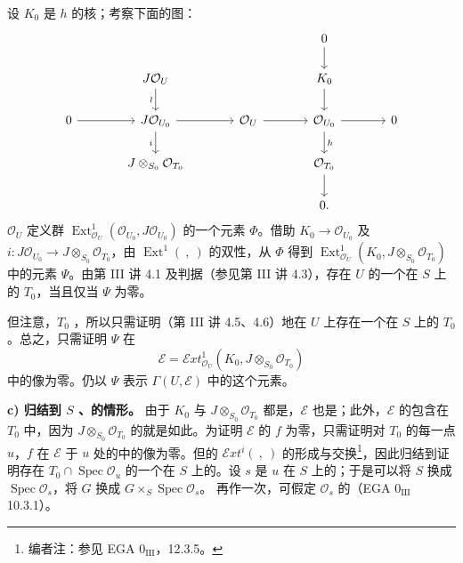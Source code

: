 设 $K_0$ 是 $h$ 的核；考察下面的图：
\[
\begin{tikzcd}[column sep=large]
&&&0\arrow[d]\\
&J\mathcal O_U\arrow[d,"\wr"']&&K_0\arrow[d]\\
0\arrow[r]&J\mathcal O_{U_0}\arrow[r]\arrow[d,"i"']&\mathcal O_U\arrow[r]&\mathcal O_{U_0}\arrow[r]\arrow[d,"h"]&0\\
&J\otimes_{S_0}\mathcal O_{T_0}&&\mathcal O_{T_0}\arrow[d]\\
&&&0.
\end{tikzcd}
\]
 $\mathcal O_U$ 定义群 $\operatorname{Ext}^1_{\mathcal O_U}(\mathcal O_{U_0},J\mathcal O_{U_0})$ 的一个元素 $\Phi$。借助 $K_0\to\mathcal O_{U_0}$ 及 $i:J\mathcal O_{U_0}\to J\otimes_{S_0}\mathcal O_{T_0}$，由 $\operatorname{Ext}^1(\ ,\ )$ 的双性，从 $\Phi$ 得到 $\operatorname{Ext}^1_{\mathcal O_U}(K_0,J\otimes_{S_0}\mathcal O_{T_0})$ 中的元素 $\Psi$。由第 III 讲 4.1 及判据（参见第 III 讲 4.3），存在 $U$ 的一个在 $S$ 上的 $T_0$，当且仅当 $\Psi$ 为零。

但注意，$T_0$ ，所以只需证明（第 III 讲 4.5、4.6）地在 $U$ 上存在一个在 $S$ 上的 $T_0$。总之，只需证明 $\Psi$ 在
\[\mathcal E=\mathscr Ext^1_{\mathcal O_U}(K_0,J\otimes_{S_0}\mathcal O_{T_0})\]
中的像为零。仍以 $\Psi$ 表示 $\Gamma(U,\mathcal E)$ 中的这个元素。

\textbf{c) 归结到 $S$ 、的情形。}
由于 $K_0$ 与 $J\otimes_{S_0}\mathcal O_{T_0}$ 都是，$\mathcal E$ 也是；此外，$\mathcal E$ 的包含在 $T_0$ 中，因为 $J\otimes_{S_0}\mathcal O_{T_0}$ 的就是如此。为证明 $\mathcal E$ 的 $f$ 为零，只需证明对 $T_0$ 的每一点 $u$，$f$ 在 $\mathcal E$ 于 $u$ 处的中的像为零。但的 $\mathscr Ext^i(\ ,\ )$ 的形成与交换\footnote{编者注：参见 EGA 0$_{\mathrm{III}}$，12.3.5。}，因此归结到证明存在 $T_0\cap\operatorname{Spec}\mathcal O_u$ 的一个在 $S$ 上的。设 $s$ 是 $u$ 在 $S$ 上的；于是可以将 $S$ 换成 $\operatorname{Spec}\mathcal O_s$，将 $G$ 换成 $G\times_S\operatorname{Spec}\mathcal O_s$。
再作一次，可假定 $\mathcal O_s$ 的（EGA 0$_{\mathrm{III}}$ 10.3.1）。


